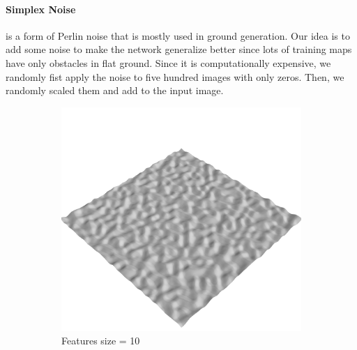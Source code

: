\documentclass[../document.tex]{subfiles}
\begin{document}
\paragraph{Simplex Noise} is a form of Perlin noise that is mostly used in ground generation. Our idea is to add some noise to make the network generalize better since lots of training maps have only obstacles in flat ground. Since it is computationally expensive, we randomly fist apply the noise to five hundred images with only zeros. Then, we randomly scaled them and add to the input image.
\begin{figure}[H]
    \centering

        \begin{subfigure}[b]{0.32\textwidth}
            \includegraphics[width=\textwidth]{../img/data-aug/3d/simplex1.png}
            \caption{Features size = 10}
        \end{subfigure}
        \begin{subfigure}[b]{0.32\linewidth}

\end{subfigure}
\end{figure}
\end{document}
